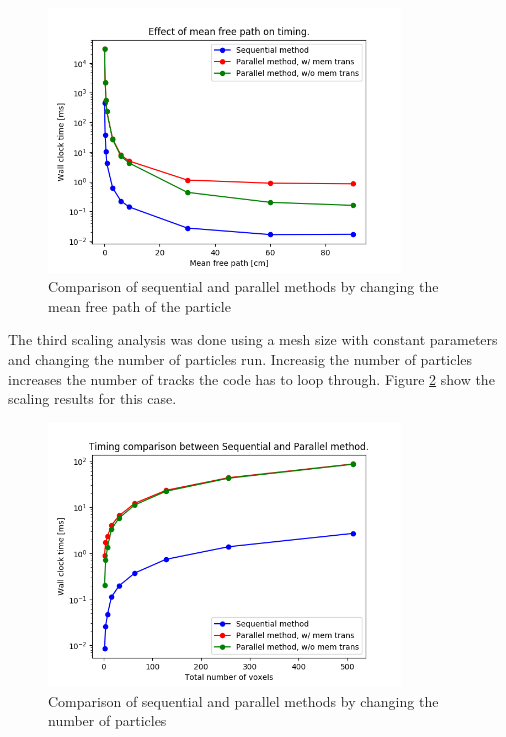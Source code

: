 \begin{figure}[H]
 \begin{centering}
 \centering
 \includegraphics[width=0.6\linewidth,height=7cm]{../figs/mean_free_path.png}
 \caption{Comparison of sequential and parallel methods by changing the mean free path of the particle}
 \label{mean_free_path}
 \end{centering}
\end{figure}



The third scaling analysis was done using a mesh size with constant parameters and 
changing the number of particles run. Increasig the number of particles increases the 
number of tracks the code has to loop through. Figure \ref{particles} show the scaling results 
for this case. 
\begin{figure}[H]
 \begin{centering}
 \centering
 \includegraphics[width=0.6\linewidth,height=7cm]{../figs/particles.png}
 \caption{Comparison of sequential and parallel methods by changing the number of particles}
 \label{particles}
 \end{centering}
\end{figure}

